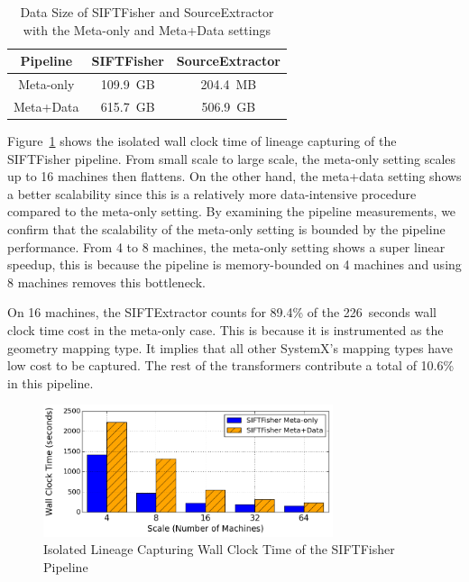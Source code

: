 \documentclass{sig-alternate}
\begin{document}
\begin{table}[t]
\begin{center}
    \caption{Data Size of SIFTFisher and SourceExtractor with the Meta-only and Meta+Data settings}
    \begin{scriptsize}
    \begin{tabular}{ | c | c | c| }
    \hline
    Pipeline & SIFTFisher & SourceExtractor \\ \hline \hline
    Meta-only & 109.9~GB & 204.4~MB \\ \hline
    Meta+Data & 615.7~GB & 506.9~GB \\ \hline
    \end{tabular}
    \end{scriptsize}
    \label{tb:apps-stats}
\end{center}   
\end{table}

Figure~\ref{fig:VOC-overhead} shows the isolated wall clock time of lineage capturing of the SIFTFisher pipeline. 
From small scale to large scale, the meta-only setting scales up to 16 machines then flattens. 
On the other hand, the meta+data setting shows a better scalability since this is a relatively more
data-intensive procedure compared to the meta-only setting. 
By examining the pipeline measurements, we confirm that the scalability of the meta-only setting is bounded
by the pipeline performance.
From 4 to 8 machines, the meta-only setting shows a super linear speedup, this is because the pipeline is memory-bounded on 4 machines
and using 8 machines removes this bottleneck.

On 16 machines, the SIFTExtractor counts for 89.4\% of the 226~seconds wall clock time cost in the meta-only case.
This is because it is instrumented as the geometry mapping type.
It implies that all other SystemX's mapping types have low cost to be captured.
The rest of the transformers contribute a total of 10.6\% in this pipeline. 

\begin{figure}[t]
\begin{center}
    \includegraphics[width=85mm]{pictures/Overhead-Time-VOC}
\caption {Isolated Lineage Capturing Wall Clock Time of the SIFTFisher Pipeline
    \label{fig:VOC-overhead}
}
\end{center}
\end{figure}
\end{document}
